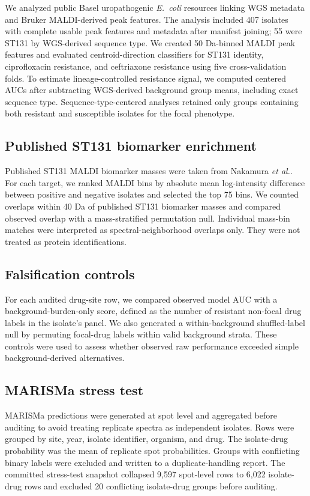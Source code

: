 \documentclass[11pt]{article}
\begin{document}
We analyzed public Basel uropathogenic \textit{E.~coli} resources linking WGS metadata and Bruker MALDI-derived peak features\cite{cuenod2023papgii}. The analysis included 407 isolates with complete usable peak features and metadata after manifest joining; 55 were ST131 by WGS-derived sequence type. We created 50 Da-binned MALDI peak features and evaluated centroid-direction classifiers for ST131 identity, ciprofloxacin resistance, and ceftriaxone resistance using five cross-validation folds. To estimate lineage-controlled resistance signal, we computed centered AUCs after subtracting WGS-derived background group means, including exact sequence type. Sequence-type-centered analyses retained only groups containing both resistant and susceptible isolates for the focal phenotype.

\subsection*{Published ST131 biomarker enrichment}

Published ST131 MALDI biomarker masses were taken from Nakamura \textit{et al.}\cite{nakamura2019st131}. For each target, we ranked MALDI bins by absolute mean log-intensity difference between positive and negative isolates and selected the top 75 bins. We counted overlaps within 40 Da of published ST131 biomarker masses and compared observed overlap with a mass-stratified permutation null. Individual mass-bin matches were interpreted as spectral-neighborhood overlaps only. They were not treated as protein identifications.

\subsection*{Falsification controls}

For each audited drug-site row, we compared observed model AUC with a background-burden-only score, defined as the number of resistant non-focal drug labels in the isolate's panel. We also generated a within-background shuffled-label null by permuting focal-drug labels within valid background strata. These controls were used to assess whether observed raw performance exceeded simple background-derived alternatives.

\subsection*{MARISMa stress test}

MARISMa predictions were generated at spot level and aggregated before auditing to avoid treating replicate spectra as independent isolates. Rows were grouped by site, year, isolate identifier, organism, and drug. The isolate-drug probability was the mean of replicate spot probabilities. Groups with conflicting binary labels were excluded and written to a duplicate-handling report. The committed stress-test snapshot collapsed 9,597 spot-level rows to 6,022 isolate-drug rows and excluded 20 conflicting isolate-drug groups before auditing.
\end{document}
